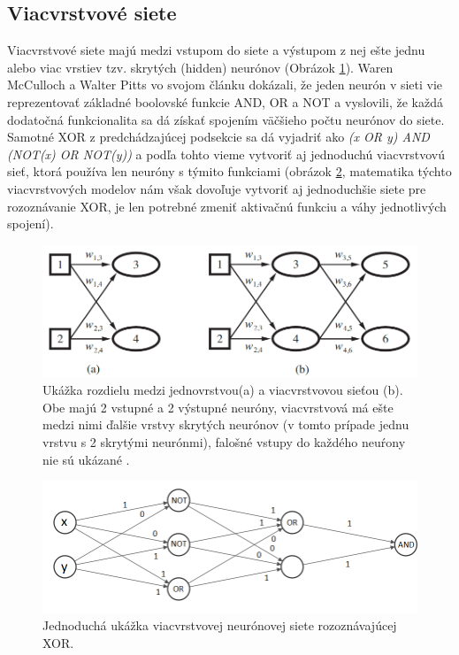 \subsection{Viacvrstvové siete}
Viacvrstvové siete majú medzi vstupom do siete a výstupom z nej ešte jednu alebo viac vrstiev tzv. skrytých (hidden) neurónov (Obrázok \ref{img:single}).
Waren McCulloch a Walter Pitts \citep{multi} vo svojom článku dokázali, že jeden neurón v sieti vie reprezentovať základné boolovské funkcie AND, OR a NOT a vyslovili, že každá dodatočná funkcionalita sa dá získať spojením väčšieho počtu neurónov do siete. Samotné XOR z predchádzajúcej podsekcie sa dá vyjadriť ako 
\textit{(x OR y) AND (NOT(x) OR NOT(y))} a podľa tohto vieme vytvoriť aj jednoduchú viacvrstvovú sieť, ktorá používa len neuróny s týmito funkciami (obrázok \ref{img:xor}, matematika týchto viacvrstvových modelov nám však dovoľuje vytvoriť aj jednoduchšie siete pre rozoznávanie XOR, je len potrebné zmeniť aktivačnú funkciu a váhy jednotlivých spojení).

\begin{figure}  [h!]
\includegraphics[width=\textwidth]{../img/nn_aima_single_multi.png}
\caption{Ukážka rozdielu medzi jednovrstvou(a) a viacvrstvovou sieťou (b). Obe majú 2 vstupné a 2 výstupné neuróny, viacvrstvová má ešte medzi nimi ďalšie vrstvy skrytých neurónov (v tomto prípade jednu vrstvu s 2 skrytými neurónmi), falošné vstupy do každého neuŕony nie sú ukázané \citep{aima}.}
\label{img:single}
\end{figure}

\begin{figure}  [h!]
\includegraphics[width=\textwidth]{../img/xor.png}
\caption{Jednoduchá ukážka viacvrstvovej neurónovej siete rozoznávajúcej XOR.}
\label{img:xor}
\end{figure}



